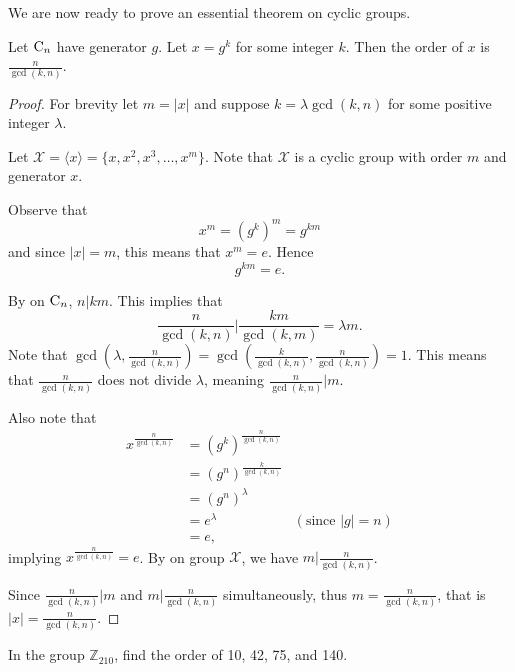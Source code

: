 We are now ready to prove an essential theorem on cyclic groups.
\begin{theorem}\label{thrm-order-of-element-in-cyclic-group}
    Let $\mathrm{C}_{n}$ have generator $g$. Let $x = g^k$ for some integer $k$. Then the order of $x$ is $\frac{n}{\gcd(k,n)}$.
\end{theorem}
\begin{proof}
    For brevity let $m = |x|$ and suppose $k = \lambda \gcd(k, n)$ for some positive integer $\lambda$.

    Let $\mathcal{X} = \langle x \rangle = \{x, x^2, x^3, \dots, x^m\}$. Note that $\mathcal{X}$ is a cyclic group with order $m$ and generator $x$.

    Observe that
    \[
        x^m = \left(g^k\right)^m = g^{km}
    \]
    and since $|x| = m$, this means that $x^m = e$. Hence
    \[
        g^{km} = e.
    \]

    By  on $\mathrm{C}_{n}$, $n \vert km$. This implies that
    \[
        \frac{n}{\gcd(k,n)} \vert \frac{km}{\gcd(k,m)} = \lambda m.
    \]
    Note that $\gcd\left(\lambda, \frac{n}{\gcd(k,n)}\right) = \gcd\left(\frac{k}{\gcd(k,n)}, \frac{n}{\gcd(k,n)}\right) = 1$. This means that $\frac{n}{\gcd(k,n)}$ does not divide $\lambda$, meaning $\frac{n}{\gcd(k,n)} \vert m$.

    Also note that
    \begin{align*}
        x^{\frac{n}{\gcd(k,n)}} &= \left(g^k\right)^{\frac{n}{\gcd(k,n)}}\\
        &= \left(g^n\right)^{\frac{k}{\gcd(k,n)}}\\
        &= \left(g^n\right)^\lambda\\
        &= e^\lambda & (\text{since } |g| = n)\\
        &= e,
    \end{align*}
    implying $x^{\frac{n}{\gcd(k,n)}} = e$. By  on group $\mathcal{X}$, we have $m \vert \frac{n}{\gcd(k,n)}$.

    Since $\frac{n}{\gcd(k,n)} \vert m$ and $m \vert \frac{n}{\gcd(k,n)}$ simultaneously, thus $m = \frac{n}{\gcd(k,n)}$, that is $|x| = \frac{n}{\gcd(k,n)}$.
\end{proof}

\begin{exercise}
    In the group $\mathbb{Z}_{210}$, find the order of 10, 42, 75, and 140.
\end{exercise}

